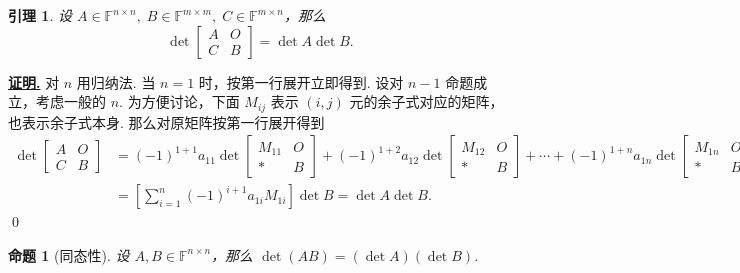 \documentclass[10pt,openany]{article}
\theoremstyle{thmstyle} %
\theoremstyle{defstyle} %
\newtheorem{lemma}[theorem]{引理}
\theoremstyle{prostyle} %
\newtheorem{proposition}[theorem]{命题}
\theoremstyle{exastyle}
\theoremstyle{remstyle}
\renewenvironment{proof}[1][证明]{\par\underline{\textbf{#1.}} \;\fangsong}{\qed\par}
\newcommand{\F}{\mathbb{F}}
\newcommand{\n}{^{n \times n}}
\newcommand{\mn}{^{m \times n}}
\begin{document}
\begin{lemma}\label{2.2.8}
	设 \( A \in \F\n, \; B \in \F^{m \times m}, \; C \in  \F\mn \)，那么
	\[ \det \begin{bmatrix}
		A & O \\
		C & B
	\end{bmatrix}= \det A \det B. \]
	
\end{lemma}

\begin{proof}
	对 \( n \) 用归纳法. 当 \( n=1 \) 时，按第一行展开立即得到. 设对 \( n-1 \) 命题成立，考虑一般的 \( n \). 为方便讨论，下面 \( M_{ij} \) 表示 \( (i,j) \) 元的余子式对应的矩阵，也表示余子式本身. 那么对原矩阵按第一行展开得到
	\begin{align*}
		\det \begin{bmatrix}
			A & O \\
			C & B
		\end{bmatrix} &= (-1)^{1+1} a_{11} \det \begin{bmatrix}
		M_{11} & O \\
		* & B
		\end{bmatrix}+ (-1)^{1+2} a_{12} \det \begin{bmatrix}
		M_{12} & O \\
		* & B
		\end{bmatrix}+\cdots+ (-1)^{1+n} a_{1n} \det \begin{bmatrix}
		M_{1n} & O \\
		* & B
		\end{bmatrix} \\
		&= \left[\sum_{i=1}^{n} (-1)^{i+1}a_{1i}M_{1i}\right] \det B= \det A \det B.
	\end{align*}
\end{proof}

\begin{proposition}[同态性]\label{2.2.9}
	设 \( A,B \in \F\n \)，那么 \( \det(AB)=(\det A)(\det B) \).
	
\end{proposition}
\end{document}
